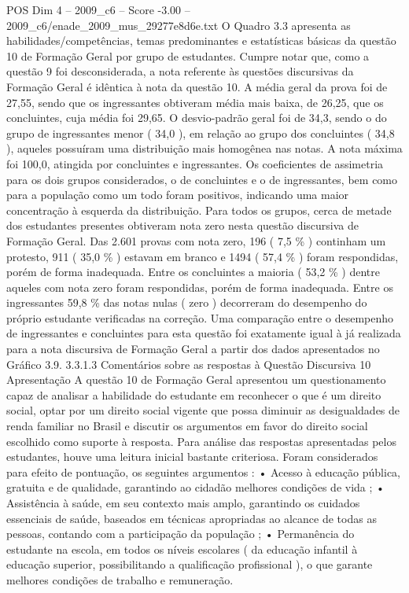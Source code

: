 \begin{textsample}{POS Dim 4 – 2009\_c6 – Score -3.00 – 2009\_c6/enade\_2009\_mus\_29277e8d6e.txt}
O Quadro 3.3 apresenta as habilidades/competências, temas predominantes e estatísticas básicas da questão 10 de Formação Geral por grupo de estudantes.
Cumpre notar que, como a questão 9 foi desconsiderada, a nota referente às questões discursivas da Formação Geral é idêntica à nota da questão 10.
A média geral da prova foi de 27,55, sendo que os ingressantes obtiveram média mais baixa, de 26,25, que os concluintes, cuja média foi 29,65.
O desvio-padrão geral foi de 34,3, sendo o do grupo de ingressantes menor ( 34,0 ), em relação ao grupo dos concluintes ( 34,8 ), aqueles possuíram uma distribuição mais homogênea nas notas.
A nota máxima foi 100,0, atingida por concluintes e ingressantes.
Os coeficientes de assimetria para os dois grupos considerados, o de concluintes e o de ingressantes, bem como para a população como um todo foram positivos, indicando uma maior concentração à esquerda da distribuição.
Para todos os grupos, cerca de metade dos estudantes presentes obtiveram nota zero nesta questão discursiva de Formação Geral.
Das 2.601 provas com nota zero, 196 ( 7,5 \% ) continham um protesto, 911 ( 35,0 \% ) estavam em branco e 1494 ( 57,4 \% ) foram respondidas, porém de forma inadequada.
Entre os concluintes a maioria ( 53,2 \% ) dentre aqueles com nota zero foram respondidas, porém de forma inadequada.
Entre os ingressantes 59,8 \% das notas nulas ( zero ) decorreram do desempenho do próprio estudante verificadas na correção.
Uma comparação entre o desempenho de ingressantes e concluintes para esta questão foi exatamente igual à já realizada para a nota discursiva de Formação Geral a partir dos dados apresentados no Gráfico 3.9. 3.3.1.3 Comentários sobre as respostas à Questão Discursiva 10 Apresentação A questão 10 de Formação Geral apresentou um questionamento capaz de analisar a habilidade do estudante em reconhecer o que é um direito social, optar por um direito social vigente que possa diminuir as desigualdades de renda familiar no Brasil e discutir os argumentos em favor do direito social escolhido como suporte à resposta.
Para análise das respostas apresentadas pelos estudantes, houve uma leitura inicial bastante criteriosa.
Foram considerados para efeito de pontuação, os seguintes argumentos : • Acesso à educação pública, gratuita e de qualidade, garantindo ao cidadão melhores condições de vida ; • Assistência à saúde, em seu contexto mais amplo, garantindo os cuidados essenciais de saúde, baseados em técnicas apropriadas ao alcance de todas as pessoas, contando com a participação da população ; • Permanência do estudante na escola, em todos os níveis escolares ( da educação infantil à educação superior, possibilitando a qualificação profissional ), o que garante melhores condições de trabalho e remuneração.

\end{textsample}
